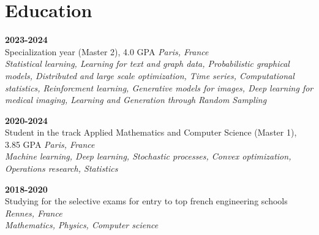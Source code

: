 \section{Education}
\vspace{0.1cm}

  \hfill \textbf{2023-2024}\\
Specialization year (Master 2), 4.0 GPA \hfill \textit{Paris, France}\\
\textit{Statistical learning, Learning for text and graph data, Probabilistic graphical models, Distributed and large scale optimization, Time series, Computational statistics, Reinforcment learning, Generative models for images, Deep learning for medical imaging, Learning and Generation through Random Sampling}

\vspace{0.1cm}

  \hfill \textbf{2020-2024}\\
Student in the track Applied Mathematics and Computer Science (Master 1), 3.85 GPA \hfill \textit{Paris, France}\\
\textit{Machine learning, Deep learning, Stochastic processes, Convex optimization, Operations research, Statistics}

\vspace{0.1cm}

 \hfill \textbf{2018-2020}\\
Studying for the selective exams for entry to top french engineering schools \hfill \textit{Rennes, France}\\
\textit{Mathematics, Physics, Computer science}\\
